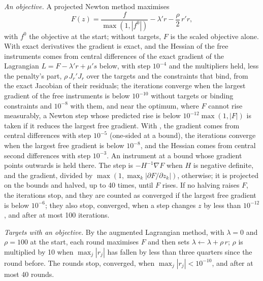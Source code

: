 \textit{An objective.} A projected Newton method maximises
\begin{equation*}
F(z) = \frac{f}{\max(1, |f^0|)} - \lambda' r - \frac{\rho}{2}\, r' r,
\end{equation*}
with $f^0$ the objective at the start; without targets, $F$ is the scaled
objective alone. With exact derivatives the gradient is exact, and the
Hessian of the free instruments comes from central differences of the exact
gradient of the Lagrangian $L = F - \lambda' r + \mu' s$ below, with step
$10^{-4}$ and the multipliers held, less the penalty's part, $\rho\,
J_r' J_r$ over the targets and the constraints that bind, from the exact
Jacobian of their residuals; the iterations converge when the largest
gradient of the free instruments is below $10^{-10}$ without targets or
binding constraints and $10^{-8}$ with them, and near the optimum, where $F$ cannot
rise measurably, a Newton step whose predicted rise is below $10^{-12}
\max(1, |F|)$ is taken if it reduces the largest free gradient. With
, the gradient comes from central differences
with step $10^{-5}$ (one-sided at a bound), the iterations converge when the
largest free gradient is below $10^{-8}$, and the Hessian comes from central
second differences with step $10^{-3}$. An instrument at a bound whose
gradient points outwards is held there. The
step is $-H^{-1}\nabla F$ when $H$ is negative definite, and the gradient,
divided by $\max(1, \max_k |\partial F/\partial z_k|)$, otherwise; it is
projected on the bounds and halved, up to 40 times, until $F$ rises. If no
halving raises $F$, the iterations stop, and they are counted as converged
if the largest free gradient is below $10^{-6}$; they also stop, converged,
when a step changes $z$ by less than $10^{-12}$, and after at most 100
iterations.

\textit{Targets with an objective.} By the augmented Lagrangian method, with
$\lambda = 0$ and $\rho = 100$ at the start, each round maximises $F$ and
then sets $\lambda \leftarrow \lambda + \rho\,r$; $\rho$ is multiplied by 10
when $\max_j |r_j|$ has fallen by less than three quarters since the round
before. The rounds stop, converged, when $\max_j |r_j| < 10^{-10}$, and after
at most 40 rounds.


